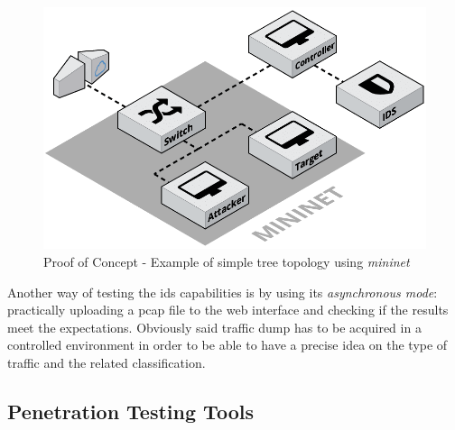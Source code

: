 \begin{figure}[h!]
    \centering
    \includegraphics[scale=0.25]{assets/figures/chapter3/PoC_topology.png}
    \caption{Proof of Concept - Example of simple tree topology using \textit{mininet}}
    \label{fig:poc-topology}
\end{figure}
Another way of testing the \gls{ids} capabilities is by using its \textit{asynchronous mode}: practically uploading a \gls{pcap} file to the web interface and checking if the results meet the expectations. Obviously said traffic dump has to be acquired in a controlled environment in order to be able to have a precise idea on the type of traffic and the related classification.


\subsection{Penetration Testing Tools}
\label{subsec:pentesting-tools}
\textcolor{dimgray}{\lipsum[1]}



